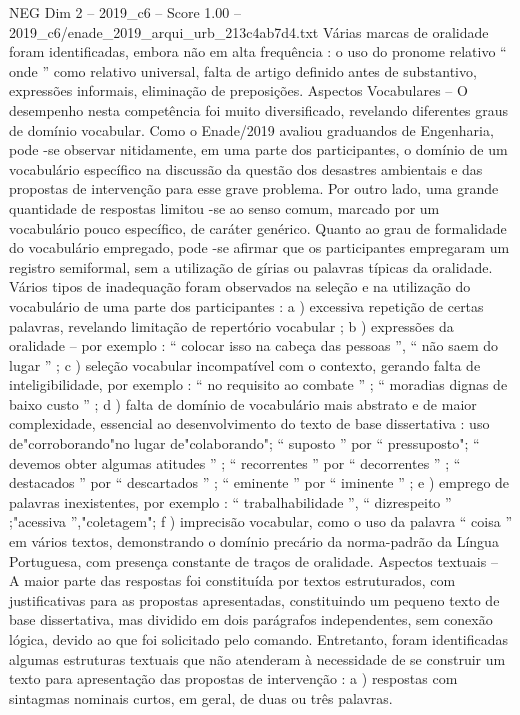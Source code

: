 \begin{textsample}{NEG Dim 2 – 2019\_c6 – Score 1.00 – 2019\_c6/enade\_2019\_arqui\_urb\_213c4ab7d4.txt}
Várias marcas de oralidade foram identificadas, embora não em alta frequência : o uso do pronome relativo “ onde ” como relativo universal, falta de artigo definido antes de substantivo, expressões informais, eliminação de preposições.
Aspectos Vocabulares – O desempenho nesta competência foi muito diversificado, revelando diferentes graus de domínio vocabular.
Como o Enade/2019 avaliou graduandos de Engenharia, pode -se observar nitidamente, em uma parte dos participantes, o domínio de um vocabulário específico na discussão da questão dos desastres ambientais e das propostas de intervenção para esse grave problema.
Por outro lado, uma grande quantidade de respostas limitou -se ao senso comum, marcado por um vocabulário pouco específico, de caráter genérico.
Quanto ao grau de formalidade do vocabulário empregado, pode -se afirmar que os participantes empregaram um registro semiformal, sem a utilização de gírias ou palavras típicas da oralidade.
Vários tipos de inadequação foram observados na seleção e na utilização do vocabulário de uma parte dos participantes : a ) excessiva repetição de certas palavras, revelando limitação de repertório vocabular ; b ) expressões da oralidade – por exemplo : “ colocar isso na cabeça das pessoas ”, “ não saem do lugar ” ; c ) seleção vocabular incompatível com o contexto, gerando falta de inteligibilidade, por exemplo : “ no requisito ao combate ” ; “ moradias dignas de baixo custo ” ; d ) falta de domínio de vocabulário mais abstrato e de maior complexidade, essencial ao desenvolvimento do texto de base dissertativa : uso de"corroborando"no lugar de"colaborando"; “ suposto ” por “ pressuposto"; “ devemos obter algumas atitudes ” ; “ recorrentes ” por “ decorrentes ” ; “ destacados ” por “ descartados ” ; “ eminente ” por “ iminente ” ; e ) emprego de palavras inexistentes, por exemplo : “ trabalhabilidade ”, “ dizrespeito ” ;"acessiva ”,"coletagem"; f ) imprecisão vocabular, como o uso da palavra “ coisa ” em vários textos, demonstrando o domínio precário da norma-padrão da Língua Portuguesa, com presença constante de traços de oralidade.
Aspectos textuais – A maior parte das respostas foi constituída por textos estruturados, com justificativas para as propostas apresentadas, constituindo um pequeno texto de base dissertativa, mas dividido em dois parágrafos independentes, sem conexão lógica, devido ao que foi solicitado pelo comando.
Entretanto, foram identificadas algumas estruturas textuais que não atenderam à necessidade de se construir um texto para apresentação das propostas de intervenção : a ) respostas com sintagmas nominais curtos, em geral, de duas ou três palavras.

\end{textsample}
